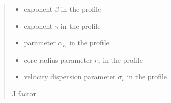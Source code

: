 \documentclass[letterpaper,10pt,english]{sphinxmanual}
\begin{document}
\begin{fulllineitems}
\begin{quote}
\begin{description}
\begin{itemize}
\item {} 
\sphinxAtStartPar
{} \textendash{} exponent \(\beta\) in the {\hyperref[\detokenize{diffsph.profiles:diffsph.profiles.templates.hdz}]{}} profile

\item {} 
\sphinxAtStartPar
{} \textendash{} exponent \(\gamma\) in the {\hyperref[\detokenize{diffsph.profiles:diffsph.profiles.templates.hdz}]{}} profile

\item {} 
\sphinxAtStartPar
{} \textendash{} parameter \(\alpha_E\) in the {\hyperref[\detokenize{diffsph.profiles:diffsph.profiles.templates.enst}]{}} profile

\item {} 
\sphinxAtStartPar
{} \textendash{} core radius parameter \(r_c\) in the {\hyperref[\detokenize{diffsph.profiles:diffsph.profiles.templates.cnfw}]{}} profile

\item {} 
\sphinxAtStartPar
{} \textendash{} velocity dispersion parameter \(\sigma_v\) in the {\hyperref[\detokenize{diffsph.profiles:diffsph.profiles.templates.sis}]{}} profile

\end{itemize}

\sphinxAtStartPar
J factor

\end{description}\end{quote}

\end{fulllineitems}

\end{document}
